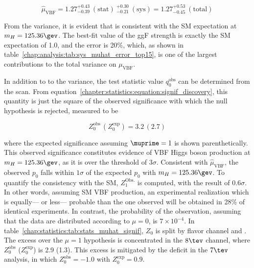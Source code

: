 \begin{equation}
\boxed{\hat{\mu}_{\textrm{VBF}} = 1.27^{+0.43}_{-0.39}\ (\textrm{stat})\
^{+0.30}_{-0.21}\ (\textrm{sys}) = 1.27^{+0.53}_{-0.45}\
(\textrm{total})}
\label{chapter:statistics:equation:observed_muhat_mH12536}
\end{equation}

\noindent
From the variance, it is evident that \muhat is consistent with the SM
expectation at $m_H = 125.36 \gev$. The best-fit value of the ggF
strength is exactly the SM expectation of 1.0, and the error is 20\%,
which, as shown in
table~\ref{chap:analysis:tab:sys_muhat_error_top15}, is one of the largest
contributions to the
total variance on $\mu_{\textrm{VBF}}$. 

In addition to to the variance,
the test statistic value $q_{0}^{\textrm{obs}}$ can be determined from
the scan. From
equation~\ref{chapter:statistics:equation:signif_discovery}, this
quantity is just the square of the observed
significance with which the null hypothesis is rejected, measured to be

\begin{equation}
\boxed{Z_0^{\textrm{obs}}\, (Z_0^{\textrm{exp}}) = 3.2\, (2.7)}
\label{chapter:statistics:equation:observed_signif_mH12536}
\end{equation}

\noindent
where the expected significance assuming $\muprime = 1$ is shown
parenthetically. This observed significance constitutes evidence of VBF Higgs boson
production at $m_H = 125.36 \gev$, as it is over the threshold of
$3\sigma$. Consistent with
$\hat{\mu}_{\textrm{VBF}}$, the observed $p_0$ falls within $1\sigma$
of the expected $p_0$ with $m_H = 125.36 \gev$. To quantify the
consistency with the SM, $Z_1^{\textrm{Obs.}}$ is computed, with the
result of $0.6\sigma$. In other words, assuming SM VBF production, an
experimental realization which is equally--- or less--- probable than
the one observed will be obtained in 28\% of identical
experiments. In contrast, the probability of the observation, assuming
that the data are distributed according to $\mu = 0$, is $7 \times
10^{-4}$. In
table~\ref{chap:statistics:tab:stats_muhat_signif}, $Z_0$ is split by
flavor channel and \sqrts. The excess over the $\mu = 1$
hypothesis is concentrated in the $8 \tev$ \eemm channel, where
$Z_0^{\textrm{obs}}$ ($Z_0^{\textrm{exp}}$) is 2.9 (1.3). This excess
is mitigated by the deficit in the $7 \tev$ analysis, in which 
$Z_0^{\textrm{obs}} = -1.0$ with $Z_0^{\textrm{exp}} = 0.9$.

